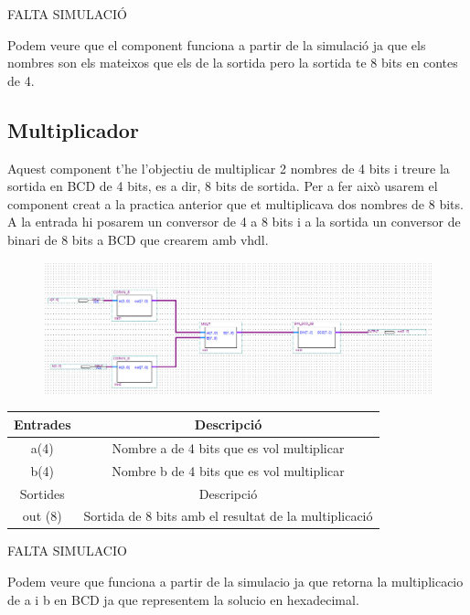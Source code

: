\documentclass[12pt, a4papre]{article}
\begin{document}
	FALTA SIMULACIÓ
	
	Podem veure que el component funciona a partir de la simulació ja que els nombres son els mateixos que els de la sortida pero la sortida te 8 bits en contes de 4.
	
	\subsection{Multiplicador}
	
	Aquest component t'he l'objectiu de multiplicar 2 nombres de 4 bits i treure la sortida en BCD de 4 bits, es a dir, 8 bits de sortida. Per a fer això usarem el component creat a la practica anterior que et multiplicava dos nombres de 8 bits. A la entrada hi posarem un conversor de 4 a 8 bits i a la sortida un conversor de binari de 8 bits a BCD que crearem amb vhdl.
	
	\begin{figure}[H]
		\begin{center}
		\includegraphics[width=130mm]{Mult_Bin_BCD.jpeg}
		\end{center}
	\end{figure}
	
	\begin{table}[h!]
		\centering
		 \begin{tabular}{|c | c|} 
			 \hline
			 Entrades & Descripció\\ [0.5ex] 
			 \hline
			 a(4) &  Nombre a de 4 bits que es vol multiplicar\\ 
			 b(4) &  Nombre b de 4 bits que es vol multiplicar\\ 
			 \hline\hline
			 Sortides & Descripció\\ [0.5ex] 
			 \hline
			out (8) & Sortida de 8 bits amb el resultat de la multiplicació\\ 
			 \hline
		 \end{tabular}
	\end{table}
	
	FALTA SIMULACIO
	
	Podem veure que funciona a partir de la simulacio ja que retorna la multiplicacio de a i b en BCD ja que representem la solucio en hexadecimal.
	
\end{document}
